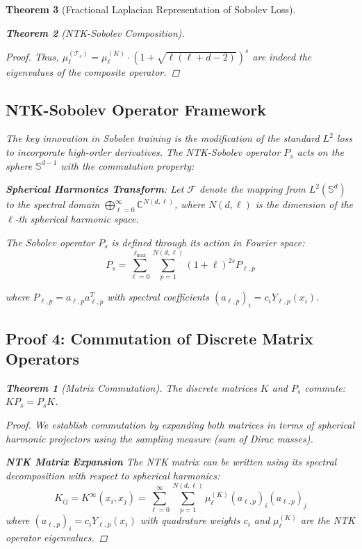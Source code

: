 \documentclass{article}
\newtheorem{theorem}{Theorem}[section]
\begin{document}
\begin{theorem}[Fractional Laplacian Representation of Sobolev Loss]
\begin{theorem}[NTK-Sobolev Composition]
\begin{proof}
Thus, $\mu_\ell^{(\mathcal{T}_s)} = \mu_\ell^{(K)} \cdot (1 + \sqrt{\ell(\ell + d - 2)})^s$ are indeed the eigenvalues of the composite operator.
\end{proof}


\subsection{NTK-Sobolev Operator Framework}

The key innovation in Sobolev training is the modification of the standard $L^2$ loss to incorporate high-order derivatives. The NTK-Sobolev operator $P_s$ acts on the sphere $\mathbb{S}^{d-1}$ with the commutation property:

\textbf{Spherical Harmonics Transform}: Let $\mathcal{F}$ denote the mapping from $L^2(\mathbb{S}^d)$ to the spectral domain $\bigoplus_{\ell=0}^{\infty} \mathbb{C}^{N(d,\ell)}$, where $N(d,\ell)$ is the dimension of the $\ell$-th spherical harmonic space.

The Sobolev operator $P_s$ is defined through its action in Fourier space:
\[ P_s = \sum_{\ell=0}^{\ell_{\max}} \sum_{p=1}^{N(d,\ell)} (1+\ell)^{2s}P_{\ell,p} \]

where $P_{\ell,p} = a_{\ell,p}a_{\ell,p}^T$ with spectral coefficients $(a_{\ell,p})_i = c_iY_{\ell,p}(x_i)$.



\subsection{Proof 4: Commutation of Discrete Matrix Operators}

\begin{theorem}[Matrix Commutation]
The discrete matrices $K$ and $P_s$ commute: $KP_s = P_sK$.
\end{theorem}

\begin{proof}
We establish commutation by expanding both matrices in terms of spherical harmonic projectors using the sampling measure (sum of Dirac masses).

\textbf{NTK Matrix Expansion}
The NTK matrix can be written using its spectral decomposition with respect to spherical harmonics:
\[ K_{ij} = K^{\infty}(x_i, x_j) = \sum_{\ell=0}^{\infty} \sum_{p=1}^{N(d,\ell)} \mu_\ell^{(K)} (a_{\ell,p})_i (a_{\ell,p})_j \]
where $(a_{\ell,p})_i = c_i Y_{\ell,p}(x_i)$ with quadrature weights $c_i$ and $\mu_\ell^{(K)}$ are the NTK operator eigenvalues.


\end{proof}
\end{theorem}
\end{theorem}
\end{document}
